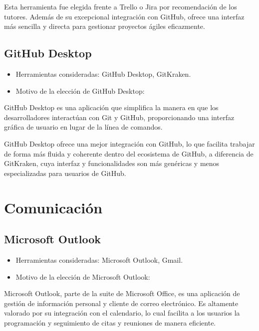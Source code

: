 Esta herramienta fue elegida frente a Trello o Jira por recomendación de los tutores. Además de su excepcional integración con GitHub, ofrece una interfaz más sencilla y directa para gestionar proyectos ágiles eficazmente.

\subsection{GitHub Desktop}\label{gitHub-desktop}

\begin{itemize}
    \item Herramientas consideradas: GitHub Desktop, GitKraken.
    \item Motivo de la elección de GitHub Desktop:
\end{itemize}

GitHub Desktop es una aplicación que simplifica la manera en que los desarrolladores interactúan con Git y GitHub, proporcionando una interfaz gráfica de usuario en lugar de la línea de comandos.

GitHub Desktop ofrece una mejor integración con GitHub, lo que facilita trabajar de forma más fluida y coherente dentro del ecosistema de GitHub, a diferencia de GitKraken, cuya interfaz y funcionalidades son más genéricas y menos especializadas para usuarios de GitHub.

\section{Comunicación}\label{comunicación}

\subsection{Microsoft Outlook}\label{microsoft-outlook}

\begin{itemize}
    \item Herramientas consideradas: Microsoft Outlook, Gmail.
    \item Motivo de la elección de Microsoft Outlook:
\end{itemize}

Microsoft Outlook, parte de la suite de Microsoft Office, es una aplicación de gestión de información personal y cliente de correo electrónico. Es altamente valorado por su integración con el calendario, lo cual facilita a los usuarios la programación y seguimiento de citas y reuniones de manera eficiente.

